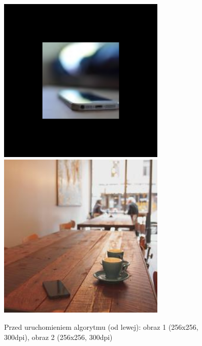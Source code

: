 \documentclass[a4paper,12pt]{book}
\begin{document}
\begin{figure}
	\caption{Przed uruchomieniem algorytmu (od lewej): obraz 1 (256x256, 300dpi), obraz 2 (256x256, 300dpi)}
	\includegraphics[width=8cm, height=8cm]{phone-geo-modified.png}
	\includegraphics[width=8cm, height=8cm]{coffee-unmodified.jpg}
\end{figure}
\end{document}
